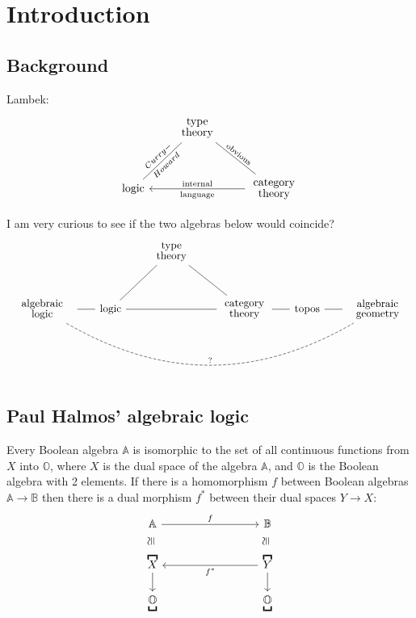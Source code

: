\chapter{Introduction}\label{chap:introduction}

\section{Background}

Lambek:
\begin{equation}
\begin{tikzcd}[row sep=1cm, column sep=0.6cm]
& \parbox{1.5cm}{\linespread{-0.5}\selectfont\centering type theory} \arrow[dl,dash,"Curry-","Howard"',sloped] \arrow[dr,dash,"\text{obvious}",sloped] & \\
\mbox{logic} & {} & \parbox{1.5cm}{\linespread{-0.5}\selectfont\centering category theory} \arrow[ll,"\text{internal}"',"\text{language}"]
\end{tikzcd}
\end{equation}

I am very curious to see if the two algebras below would coincide?
\begin{equation}
\begin{tikzcd}[row sep=1cm, column sep=0.6cm]
 & & \parbox{1.5cm}{\linespread{-0.5}\selectfont\centering type theory} \arrow[dl,dash] \arrow[dr,dash] & & & \\
\parbox{2cm}{\linespread{-0.5}\selectfont\centering algebraic logic} \arrow[rrrrr, dashed, dash, bend right,"?"] \arrow[r,dash] & \mbox{logic} \arrow[rr,dash] & {} & \parbox{1.5cm}{\linespread{-0.5}\selectfont\centering category theory} \arrow[r,dash] & \mbox{topos} \arrow[r,dash] & \parbox{2cm}{\linespread{-0.5}\selectfont\centering algebraic geometry}
\end{tikzcd}
\end{equation}

\section{Paul Halmos' algebraic logic}

Every Boolean algebra $\mathbb{A}$ is isomorphic to the set of all continuous functions from $X$ into $\mathbb{O}$, where $X$ is the dual space of the algebra $\mathbb{A}$, and $\mathbb{O}$ is the Boolean algebra with 2 elements.  If there is a homomorphism $f$ between Boolean algebras $\mathbb{A} \rightarrow \mathbb{B}$ then there is a dual morphism $f^*$ between their dual spaces $Y \rightarrow X$:
\begin{equation}
\begin{tikzcd}[column sep=3cm, row sep=0.6cm]
\mathbb{A} \arrow[r,"f"] \arrow[d,shift left=2,phantom,"\cong"{anchor=south,rotate=90}] & \mathbb{B} \arrow[d,shift left=2,phantom,"\cong"{anchor=south,rotate=90}] \\
\overbracket{X} \arrow[d] & \overbracket{Y} \arrow[d] \arrow[l,"f^*"] \\
\underbracket{\mathbb{O}} & \underbracket{\mathbb{O}} 
\end{tikzcd}
\end{equation}

